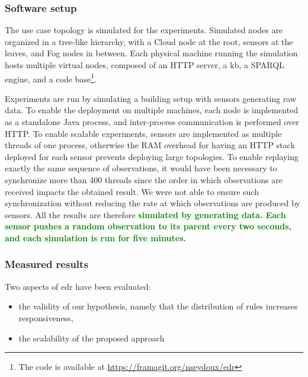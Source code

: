 \documentclass{iosart2c}
\newcommand{\added}[1]{\textcolor{green}{\textbf{#1}}}
\begin{document}
\subsubsection{Software setup}

The use case topology is simulated for the experiments.
Simulated nodes are organized in a tree-like hierarchy, with a Cloud node at the root, sensors at the leaves, and Fog nodes in between.
Each physical machine running the simulation hosts multiple virtual nodes, composed of an HTTP server, a \gls{kb}, a SPARQL engine, and a code base\footnote{The code is available at \url{https://framagit.org/nseydoux/edr}}.

Experiments are run by simulating a building setup with sensors generating raw data. 
To enable the deployment on multiple machines, each node is implemented as a standalone Java process, and inter-process communication is performed over HTTP. 
To enable scalable experiments, sensors are implemented as multiple threads of one process, otherwise the RAM overhead for having an HTTP stack deployed for each sensor prevents deploying large topologies.
To enable replaying exactly the same sequence of observations, it would have been necessary to synchronize more than 400 threads since the order in which observations are received impacts the obtained result. 
We were not able to ensure such synchronization without reducing the rate at which observations are produced by sensors.
All the results are therefore \added{simulated by generating data.
Each sensor pushes a random observation to its parent every two seconds, and each simulation is run for five minutes.}

\subsubsection{Measured results}

Two aspects of \gls{edr} have been evaluated:
\begin{itemize}
	\item the validity of our hypothesis, namely that the distribution of rules increases responsiveness,
	\item the scalability of the proposed approach
\end{itemize} 
\end{document}

